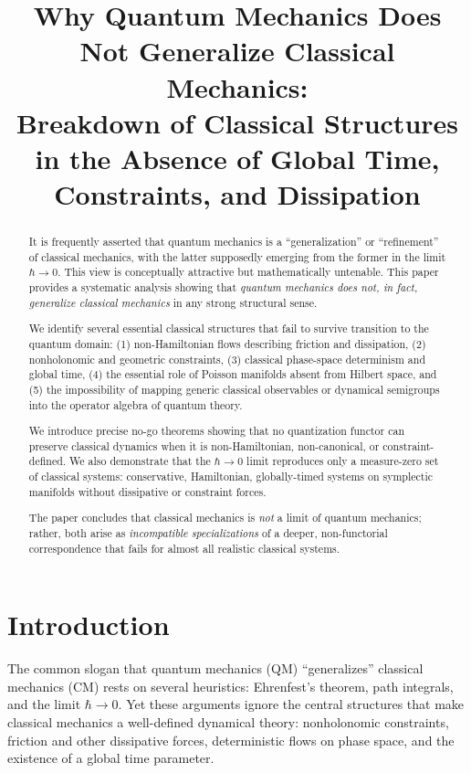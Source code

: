 \documentclass[12pt]{article}
\title{Why Quantum Mechanics Does Not Generalize Classical Mechanics:\\
Breakdown of Classical Structures in the Absence of Global Time, Constraints, and Dissipation}
\author{ }
\date{}
\begin{document}
\maketitle

\begin{abstract}
It is frequently asserted that quantum mechanics is a ``generalization'' or
``refinement'' of classical mechanics, with the latter supposedly emerging from the former in the limit $\hbar \to 0$.
This view is conceptually attractive but mathematically untenable.  
This paper provides a systematic analysis showing that \emph{quantum mechanics does not, in fact, generalize classical mechanics} in any strong structural sense.  

We identify several essential classical structures that fail to survive transition to the quantum domain:
(1) non-Hamiltonian flows describing friction and dissipation, 
(2) nonholonomic and geometric constraints, 
(3) classical phase-space determinism and global time, 
(4) the essential role of Poisson manifolds absent from Hilbert space,
and (5) the impossibility of mapping generic classical observables or dynamical semigroups into the operator algebra of quantum theory.

We introduce precise no-go theorems showing that no quantization functor can preserve classical dynamics when it is non-Hamiltonian, non-canonical, or constraint-defined.  
We also demonstrate that the $\hbar \to 0$ limit reproduces only a measure-zero set of classical systems: conservative, Hamiltonian, globally-timed systems on symplectic manifolds without dissipative or constraint forces.  

The paper concludes that classical mechanics is \emph{not} a limit of quantum mechanics; rather, both arise as \emph{incompatible specializations} of a deeper, non-functorial correspondence that fails for almost all realistic classical systems.
\end{abstract}

\tableofcontents

\section{Introduction}

The common slogan that quantum mechanics (QM) ``generalizes'' classical mechanics (CM) rests on several heuristics:
Ehrenfest's theorem, path integrals, and the limit $\hbar \to 0$.  
Yet these arguments ignore the central structures that make classical mechanics a well-defined dynamical theory: nonholonomic constraints, friction and other dissipative forces, deterministic flows on phase space, and the existence of a global time parameter.
\end{document}
